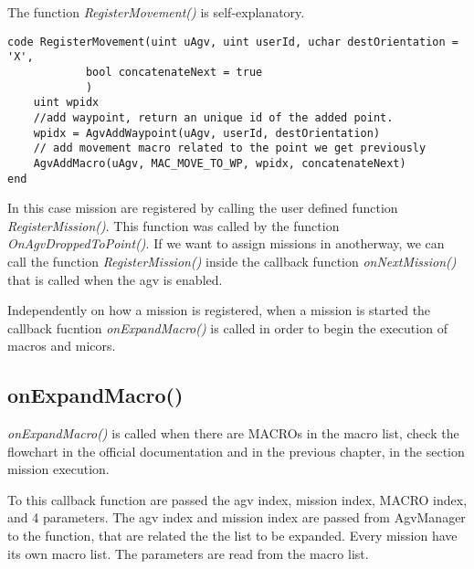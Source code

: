 The function \textit{RegisterMovement()} is self-explanatory.

\begin{lstlisting}[caption=RegisterMovement() function,label=lstRegisterMovment]
code RegisterMovement(uint uAgv, uint userId, uchar destOrientation = 'X',
			bool concatenateNext = true
			)
	uint wpidx
	//add waypoint, return an unique id of the added point.
	wpidx = AgvAddWaypoint(uAgv, userId, destOrientation)
	// add movement macro related to the point we get previously
	AgvAddMacro(uAgv, MAC_MOVE_TO_WP, wpidx, concatenateNext)
end
\end{lstlisting}

In this case mission are registered by calling the user defined function \textit{RegisterMission()}. This function was called by the function \textit{OnAgvDroppedToPoint()}. If we want to assign missions in anotherway, we can call the function \textit{RegisterMission()} inside the callback function \textit{onNextMission()} that is called when the agv is enabled.

Independently on how a mission is registered, when a mission is started the callback fucntion \textit{onExpandMacro()} is called in order to begin the execution of macros and micors.


\subsection*{onExpandMacro()}

\textit{onExpandMacro()} is called when there are MACROs in the macro list, check the flowchart in the official documentation and in the previous chapter, in the section mission execution.

To this callback function are passed the agv index, mission index, MACRO index, and 4 parameters. The agv index and mission index are passed from AgvManager to the function, that are related the the list to be expanded. Every mission have its own macro list. The parameters are read from the macro list.

